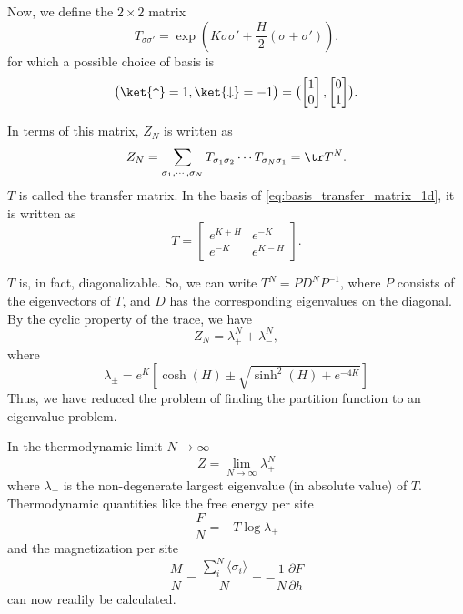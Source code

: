 Now, we define the $2 \times 2$ matrix
\begin{equation}\label{eq:transfer_matrix_1d_ising}
  T_{\sigma \sigma'} = \exp(K \sigma \sigma' + \frac{H}{2}(\sigma + \sigma')).
\end{equation}
for which a possible choice of basis is
\begin{equation}\label{eq:basis_transfer_matrix_1d}
  \bigl( \ket{\uparrow} = 1, \ket{\downarrow} = -1 \bigr) =
  \bigl(
  \begin{bmatrix}
    1 \\
    0
  \end{bmatrix},
  \begin{bmatrix}
    0 \\
    1
  \end{bmatrix}
  \bigr).
\end{equation}

In terms of this matrix, $Z_N$ is written as
\begin{equation}\label{eq:partition_function_transfer_matrix_1d}
  Z_N = \sum_{\sigma_1, \cdots, \sigma_N} T_{\sigma_1 \sigma_2} \dotsm T_{\sigma_N \sigma_1} = \tr T^N.
\end{equation}
$T$ is called the transfer matrix. In the basis of \autoref{eq:basis_transfer_matrix_1d},
it is written as
\begin{equation}
  T = \begin{bmatrix}
    e^{K+H} & e^{-K} \\
    e^{-K} & e^{K-H}
  \end{bmatrix}.
\end{equation}

$T$ is, in fact, diagonalizable. So, we can write $T^N = P D^N
P^{-1}$, where $P$ consists of the eigenvectors of $T$, and $D$ has the corresponding eigenvalues on the diagonal. By the cyclic property of the
trace, we have
\begin{equation}
  Z_N = \lambda_{+}^{N} + \lambda_{-}^{N},
\end{equation}
where
\begin{equation}
  \lambda_{\pm} = e^{K} \left[ \cosh(H) \pm \sqrt{\sinh^2(H) + e^{-4K}} \right]
\end{equation}
Thus, we have reduced the problem of finding the partition function to an
eigenvalue problem.

In the thermodynamic limit $N \to \infty$
\begin{equation}
  Z = \lim_{N \to \infty} \lambda_{+}^{N}
\end{equation}
where $\lambda_+$ is the non-degenerate largest eigenvalue (in absolute value) of $T$.
Thermodynamic quantities like the free energy per site
\begin{equation}
  \frac{F}{N} = -T \log \lambda_{+}
\end{equation}
and the magnetization per site
\begin{equation}
  \frac{M}{N} = \frac{\sum_{i}^{N} \langle \sigma_i \rangle}{N} = - \frac{1}{N}\frac{\partial F}{\partial h}
\end{equation}
can now readily be calculated.

